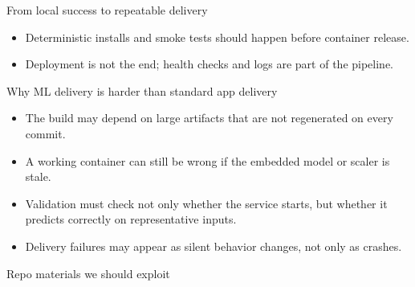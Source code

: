 \begin{frame}{From local success to repeatable delivery}
\centering
{}
\vspace{0.7em}
\begin{itemize}
\item Deterministic installs and smoke tests should happen before container release.
\item Deployment is not the end; health checks and logs are part of the pipeline.
\end{itemize}
\coursefooter
\end{frame}

\begin{frame}{Why ML delivery is harder than standard app delivery}
\begin{itemize}
\item The build may depend on large artifacts that are not regenerated on every commit.
\item A working container can still be wrong if the embedded model or scaler is stale.
\item Validation must check not only whether the service starts, but whether it predicts correctly on representative inputs.
\item Delivery failures may appear as silent behavior changes, not only as crashes.
\end{itemize}
\coursefooter
\end{frame}

\begin{frame}{Repo materials we should exploit}
\coursefooter
\end{frame}

